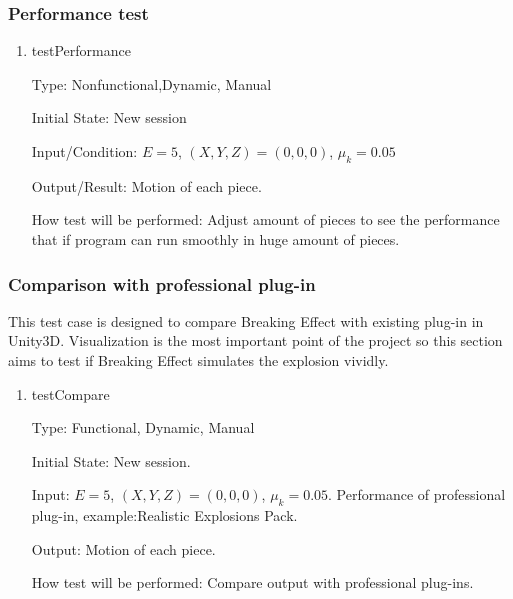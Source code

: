 \documentclass[12pt, titlepage]{article}
\begin{document}
\subsubsection{Performance test}

\begin{enumerate}

\item{testPerformance\\}

Type: Nonfunctional,Dynamic, Manual
					
Initial State: New session
					
Input/Condition: $E = 5$, $(X,Y,Z) = (0,0,0)$, $\mu_{k} = 0.05$
					
Output/Result: Motion of each piece.
					
How test will be performed: Adjust amount of pieces to see the performance that if program can run smoothly in huge amount of pieces.

\end{enumerate}


\subsubsection{Comparison with professional plug-in}

This test case is designed to compare Breaking Effect with existing plug-in in Unity3D. Visualization is the most important point of the project so this section aims to test if Breaking Effect simulates the explosion vividly. 

\begin{enumerate}
	
	\item{testCompare\\}
	
	Type: Functional, Dynamic, Manual
	
	Initial State: New session.
	
	Input: $E = 5$, $(X,Y,Z) = (0,0,0)$, $\mu_{k} = 0.05$. Performance of professional plug-in, example:Realistic Explosions Pack.
	
	Output: Motion of each piece.
	
	How test will be performed: Compare output with professional plug-ins. 
	
\end{enumerate}
\end{document}
